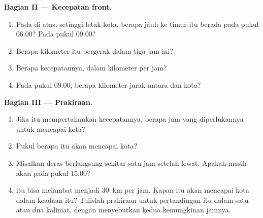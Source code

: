 \begin{problem}
\noindent\textbf{Bagian II --- Kecepatan front.}\par\nopagebreak
\begin{enumerate}[resume, beginpenalty=10000]
  \item Pada  di atas, setinggi letak kota, berapa jauh ke timur
         itu berada pada pukul 06.00? Pada pukul 09.00?
  \item Berapa kilometer  itu bergerak dalam tiga jam ini?
  \item Berapa kecepatannya, dalam kilometer per jam?
  \item Pada pukul 09.00, berapa kilometer jarak antara  dan kota?
\end{enumerate}

\noindent\textbf{Bagian III --- Prakiraan.}\par\nopagebreak
\begin{enumerate}[resume, beginpenalty=10000]
  \item Jika  itu mempertahankan kecepatannya, berapa jam yang
        diperlukannya untuk mencapai kota?
  \item Pukul berapa  itu akan mencapai kota?
  \item Misalkan  deras berlangsung sekitar satu jam setelah 
        lewat. Apakah masih akan  pada pukul 15.00?
  \item {} itu bisa melambat menjadi \qty{30}{km} per jam. Kapan 
        itu akan mencapai kota dalam keadaan itu? Tulislah prakiraan untuk
        pertandingan itu dalam satu atau dua kalimat, dengan menyebutkan
        kedua kemungkinan jamnya.
\end{enumerate}
\end{problem}
